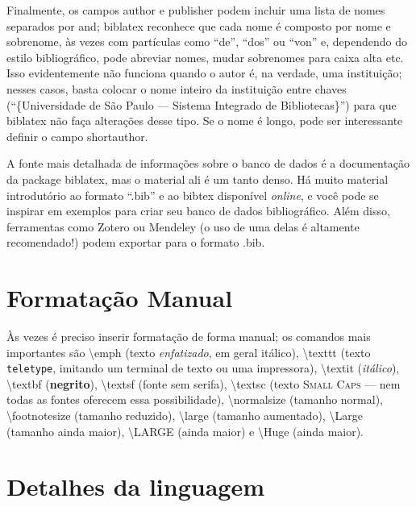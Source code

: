Finalmente, os campos \textsf{author} e \textsf{publisher} podem incluir uma
lista de nomes separados por \textsf{and}; biblatex reconhece que cada nome é
composto por nome e sobrenome, às vezes com partículas como ``de'', ``dos''
ou ``von'' e, dependendo do estilo bibliográfico, pode abreviar nomes, mudar
sobrenomes para caixa alta etc. Isso evidentemente não funciona quando o autor
é, na verdade, uma instituição; nesses casos, basta colocar o nome inteiro da
instituição entre chaves (``\{Universidade de São Paulo --- Sistema Integrado
de Bibliotecas\}'') para que biblatex não faça alterações desse tipo. Se o
nome é longo, pode ser interessante definir o campo \textsf{shortauthor}.

A fonte mais detalhada de informações sobre o banco de dados é a
documentação da package biblatex, mas o material ali é um tanto denso.
Há muito material introdutório ao formato ``.bib'' e ao bibtex disponível
\emph{online}, e você pode se inspirar em exemplos para criar seu banco de
dados bibliográfico. Além disso, ferramentas como Zotero ou
Mendeley (o uso de uma delas é altamente recomendado!)
podem exportar para o formato .bib.

\section{Formatação Manual}

Às vezes é preciso inserir formatação de forma manual; os comandos mais
importantes são \textsf{\textbackslash{}emph} (texto \emph{enfatizado}, em geral
itálico), \textsf{\textbackslash{}texttt} (texto \texttt{teletype}, imitando um
terminal de texto ou uma impressora), \textsf{\textbackslash{}textit}
(\textit{itálico}), \textsf{\textbackslash{}textbf} (\textbf{negrito}),
\textsf{\textbackslash{}textsf} (fonte \textsf{sem serifa}),
\textsf{\textbackslash{}textsc} (texto \textsc{Small Caps} --- nem todas
as fontes oferecem essa possibilidade),
\textsf{\textbackslash{}normalsize} (tamanho normal),
\textsf{\textbackslash{}footnotesize} (tamanho reduzido),
\textsf{\textbackslash{}large} (tamanho aumentado),
\textsf{\textbackslash{}Large} (tamanho ainda maior),
\textsf{\textbackslash{}LARGE} (ainda maior) e
\textsf{\textbackslash{}Huge} (ainda maior).

\section{Detalhes da linguagem}

